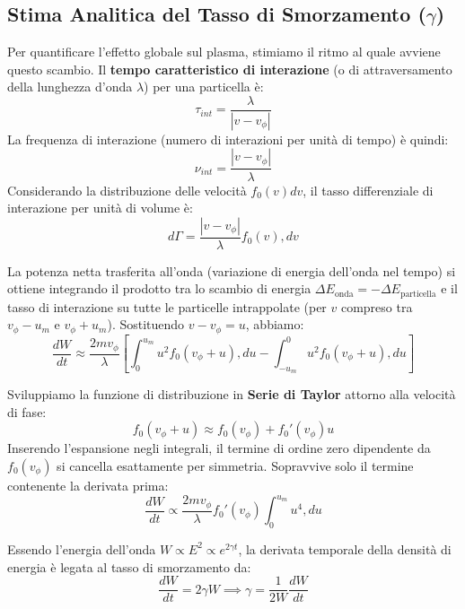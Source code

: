\subsection{Stima Analitica del Tasso di Smorzamento ($\gamma$)}
Per quantificare l'effetto globale sul plasma, stimiamo il ritmo al quale avviene questo scambio. Il \textbf{tempo caratteristico di interazione} (o di attraversamento della lunghezza d'onda $\lambda$) per una particella è:
\begin{equation}
\tau_{int} = \frac{\lambda}{|v - v_\phi|}
\end{equation}
La frequenza di interazione (numero di interazioni per unità di tempo) è quindi:
\begin{equation}
\nu_{int} = \frac{|v - v_\phi|}{\lambda}
\end{equation}
Considerando la distribuzione delle velocità $f_0(v) dv$, il tasso differenziale di interazione per unità di volume è:
\begin{equation}
d\Gamma = \frac{|v - v_\phi|}{\lambda} f_0(v) , dv
\end{equation}

La potenza netta trasferita all'onda (variazione di energia dell'onda nel tempo) si ottiene integrando il prodotto tra lo scambio di energia $\Delta E_{\text{onda}} = -\Delta E_{\text{particella}}$ e il tasso di interazione su tutte le particelle intrappolate (per $v$ compreso tra $v_\phi - u_m$ e $v_\phi + u_m$). Sostituendo $v - v_\phi = u$, abbiamo:
\begin{equation}
\frac{dW}{dt} \approx \frac{2m v_\phi}{\lambda} \left[ \int_{0}^{u_m} u^2 f_0(v_\phi + u) , du - \int_{-u_m}^{0} u^2 f_0(v_\phi + u) , du \right]
\end{equation}

Sviluppiamo la funzione di distribuzione in \textbf{Serie di Taylor} attorno alla velocità di fase:
\begin{equation}
f_0(v_\phi + u) \approx f_0(v_\phi) + f_0'(v_\phi) u
\end{equation}
Inserendo l'espansione negli integrali, il termine di ordine zero dipendente da $f_0(v_\phi)$ si cancella esattamente per simmetria. Sopravvive solo il termine contenente la derivata prima:
\begin{equation}
\frac{dW}{dt} \propto \frac{2m v_\phi}{\lambda} f_0'(v_\phi) \int_{0}^{u_m} u^4 , du
\end{equation}

Essendo l'energia dell'onda $W \propto E^2 \propto e^{2\gamma t}$, la derivata temporale della densità di energia è legata al tasso di smorzamento da:
\begin{equation}
\frac{dW}{dt} = 2\gamma W \implies \gamma = \frac{1}{2W} \frac{dW}{dt}
\end{equation}

